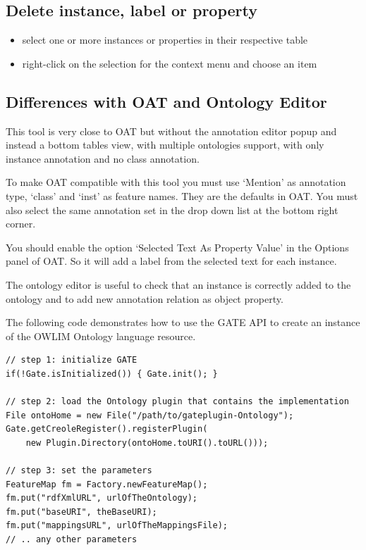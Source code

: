 {\subsection{Delete instance, label or property}

\begin{itemize}
\item select one or more instances or properties in their respective table
\item right-click on the selection for the context menu and choose an item
\end{itemize}

\subsection{Differences with OAT and Ontology Editor}

This tool is very close to OAT but without the annotation editor popup and
instead a bottom tables view, with multiple ontologies support, with only
instance annotation and no class annotation.

To make OAT compatible with this tool you must use `Mention' as annotation
type, `class' and `inst' as feature names. They are the defaults in OAT. You
must also select the same annotation set in the drop down list at the bottom
right corner.

You should enable the option `Selected Text As Property Value' in the
Options panel of OAT. So it will add a label from the selected text for each
instance.

The ontology editor is useful to check that an instance is correctly added
to the ontology and to add new annotation relation as object property.


The following code demonstrates how to use the GATE API to create an instance of
the OWLIM Ontology language resource.

\begin{lstlisting}
// step 1: initialize GATE
if(!Gate.isInitialized()) { Gate.init(); }

// step 2: load the Ontology plugin that contains the implementation
File ontoHome = new File("/path/to/gateplugin-Ontology");
Gate.getCreoleRegister().registerPlugin(
    new Plugin.Directory(ontoHome.toURI().toURL()));

// step 3: set the parameters
FeatureMap fm = Factory.newFeatureMap();
fm.put("rdfXmlURL", urlOfTheOntology);
fm.put("baseURI", theBaseURI);
fm.put("mappingsURL", urlOfTheMappingsFile);
// .. any other parameters


\end{lstlisting}}
